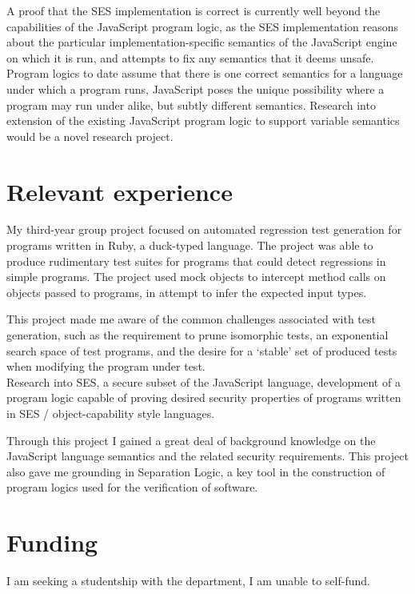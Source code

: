 \documentclass[a4paper]{article}
\begin{document}
A proof that the SES implementation is correct is currently well beyond the
capabilities of the JavaScript program logic, as the SES implementation reasons
about the particular implementation-specific semantics of the JavaScript engine
on which it is run, and attempts to fix any semantics that it deems unsafe.
Program logics to date assume that there is one correct semantics for a language
under which a program runs, JavaScript poses the unique possibility where a
program may run under alike, but subtly different semantics. Research into
extension of the existing JavaScript program logic to support variable semantics
would be a novel research project.

\section{Relevant experience}
My third-year group project focused on automated regression test generation for
programs written in Ruby, a duck-typed language. The project was able to produce
rudimentary test suites for programs that could detect regressions in simple
programs. The project used mock objects to intercept method calls on objects
passed to programs, in attempt to infer the expected input types.

This project made me aware of the common challenges associated with test
generation, such as the requirement to prune isomorphic tests, an exponential
search space of test programs, and the desire for a `stable' set of produced
tests when modifying the program under test.
\\

Research into SES, a secure subset of the JavaScript language, development of
a program logic capable of proving desired security properties of programs
written in SES / object-capability style languages.

Through this project I gained a great deal of background knowledge on the
JavaScript language semantics and the related security requirements. This
project also gave me grounding in Separation Logic, a key tool in
the construction of program logics used for the verification of software.

\section{Funding}
I am seeking a studentship with the department, I am unable to self-fund.
\end{document}
